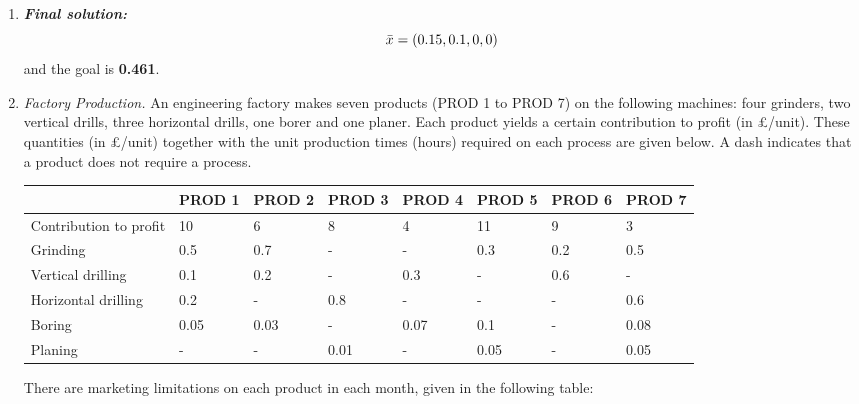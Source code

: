 \documentclass[12pt,a4paper]{article}
\makeatletter
\newtheorem*{solution}{Solution}
\theoremstyle{definition}
\renewenvironment{solution}[1][Solution] {\par\pushQED{\qed}\normalfont\topsep6\p@\@plus6\p@\relax\trivlist\item[\hskip\labelsep\bfseries#1\@addpunct{.}]\ignorespaces}{\popQED\endtrivlist\@endpefalse} \makeatother
\makeatother
\begin{document}
\begin{enumerate}
\begin{solution}
\begin{enumerate}
        \textbf{\textit{Final solution:}} 
        $$\Bar{x}=(0.15,0.1,0,0)$$
        and the goal is \textbf{0.461}.
    \end{enumerate}
    \end{solution}
    \item
    \textit{Factory Production.} An engineering factory makes seven products (PROD 1 to PROD 7) on the following machines: four grinders, two vertical drills, three horizontal drills, one borer and one planer. Each product yields a certain contribution to profit (in \pounds/unit). These quantities (in \pounds/unit) together with the unit production times (hours) required on each process are given below. A dash indicates that a product does not require a process.

    \begin{table}[htbp]
      \scriptsize
      \centering
      \renewcommand\arraystretch{1.1}
      \begin{tabular}{m{} m{}<{\centering} m{}<{\centering} m{}<{\centering} m{}<{\centering} m{}<{\centering} m{}<{\centering} m{}<{\centering}}
      \hline
       & \textbf{PROD 1} & \textbf{PROD 2} & \textbf{PROD 3} & \textbf{PROD 4} & \textbf{PROD 5} & \textbf{PROD 6} &  \textbf{PROD 7} \\\hline
      Contribution to profit & 10 & 6 & 8 & 4 & 11 & 9 & 3 \\
      Grinding & 0.5 & 0.7 & - & - & 0.3 & 0.2 & 0.5 \\
      Vertical drilling & 0.1 & 0.2 & - & 0.3 & - & 0.6 & - \\
      Horizontal drilling & 0.2 & - & 0.8 & - & - & - & 0.6 \\
      Boring & 0.05 & 0.03 & - & 0.07 & 0.1 & - & 0.08 \\
      Planing & - & - & 0.01 & - & 0.05 & - & 0.05 \\
      \hline
      \end{tabular}
    \end{table}

    There are marketing limitations on each product in each month, given in the following table:


\end{enumerate}
\end{document}
